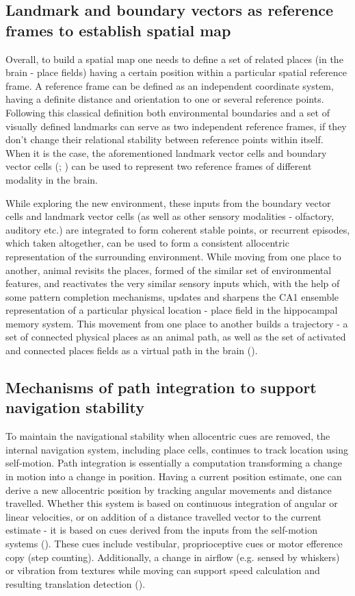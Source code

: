 \subsection{Landmark and boundary vectors as reference frames to establish spatial map}

Overall, to build a spatial map one needs to define a set of related places (in the brain - place fields) having a certain position within a particular spatial reference frame. A reference frame can be defined as an independent coordinate system, having a definite distance and orientation to one or several reference points. Following this classical definition both environmental boundaries and a set of visually defined landmarks can serve as two independent reference frames, if they don’t change their relational stability between reference points within itself. When it is the case, the aforementioned landmark vector cells and boundary vector cells (\cite{Deshmukh2011}; \cite{Hooydal2019}) can be used to represent two reference frames of different modality in the brain.

While exploring the new environment, these inputs from the boundary vector cells and landmark vector cells (as well as other sensory modalities - olfactory, auditory etc.) are integrated to form coherent stable points, or recurrent episodes, which taken altogether, can be used to form a consistent allocentric representation of the surrounding environment. While moving from one place to another, animal revisits the places, formed of the similar set of environmental features, and reactivates the very similar sensory inputs which, with the help of some pattern completion mechanisms, updates and sharpens the CA1 ensemble representation of a particular physical location - place field in the hippocampal memory system. This movement from one place to another builds a trajectory - a set of connected physical places as an animal path, as well as the set of activated and connected places fields as a virtual path in the brain (\cite{Buzsaki2013}).


\subsection{Mechanisms of path integration to support navigation stability}


To maintain the navigational stability when allocentric cues are removed, the internal navigation system, including place cells, continues to track location using self-motion. Path integration is essentially a computation transforming a change in motion into a change in position. Having a current position estimate, one can derive a new allocentric position by tracking angular movements and distance travelled. Whether this system is based on continuous integration of angular or linear velocities, or on addition of a distance travelled vector to the current estimate - it is based on cues derived from the inputs from the self-motion systems (\cite{Etienne2004a}). These cues include vestibular, proprioceptive cues or motor efference copy (step counting). Additionally, a change in airflow (e.g. sensed by whiskers) or vibration from textures while moving can support speed calculation and resulting translation detection (\cite{Savelli2019}).

